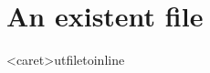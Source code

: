 \documentclass[11pt]{article}
\begin{document}
    \section{An existent file}
    \inp<caret>ut{filetoinline}
\end{document}
